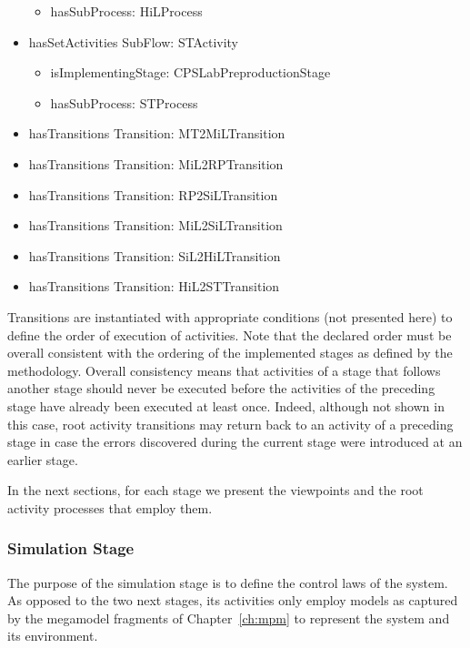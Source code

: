 \begin{itemize}
\begin{itemize}
            \item hasSubProcess: HiLProcess
        \end{itemize}
    \item hasSetActivities SubFlow: STActivity
        \begin{itemize}
            \item isImplementingStage: CPSLabPreproductionStage
            \item hasSubProcess: STProcess
        \end{itemize}
    \item hasTransitions Transition: MT2MiLTransition
    \item hasTransitions Transition: MiL2RPTransition
    \item hasTransitions Transition: RP2SiLTransition
    \item hasTransitions Transition: MiL2SiLTransition
    \item hasTransitions Transition: SiL2HiLTransition
    \item hasTransitions Transition: HiL2STTransition
\end{itemize}

Transitions are instantiated with appropriate conditions (not presented here) to define the order of execution of activities. Note that the declared order must be overall consistent with the ordering of the implemented stages as defined by the methodology. Overall consistency means that activities of a stage that follows another stage should never be executed before the activities of the preceding stage have already been executed at least once. Indeed, although not shown in this case, root activity transitions may return back to an activity of a preceding stage in case the errors discovered during the current stage were introduced at an earlier stage.

In the next sections, for each stage we present the viewpoints and the root activity processes that employ them.

\subsubsection{Simulation Stage}
%
The purpose of the simulation stage is to define the control laws of the system. As opposed to the two next stages, its activities only employ models as captured by the megamodel fragments of Chapter~\ref{ch:mpm} to represent the system and its environment.

